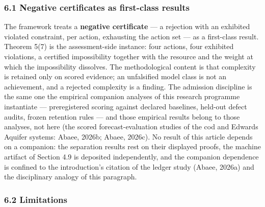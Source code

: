 \documentclass[11pt]{article}
\begin{document}
\subsubsection{6.1 Negative certificates as first-class
results}\label{negative-certificates-as-first-class-results}

The framework treats a \textbf{negative certificate} --- a rejection
with an exhibited violated constraint, per action, exhausting the action
set --- as a first-class result. Theorem 5(7) is the assessment-side
instance: four actions, four exhibited violations, a certified
impossibility together with the resource and the weight at which the
impossibility dissolves. The methodological content is that complexity
is retained only on scored evidence; an unfalsified model class is not
an achievement, and a rejected complexity is a finding. The admission
discipline is the same one the empirical companion analyses of this
research programme instantiate --- preregistered scoring against
declared baselines, held-out defect audits, frozen retention rules ---
and those empirical results belong to those analyses, not here (the
scored forecast-evaluation studies of the cod and Edwards Aquifer
systems: Abaee, 2026b; Abaee, 2026c). No result of this article depends
on a companion: the separation results rest on their displayed proofs,
the machine artifact of Section 4.9 is deposited independently, and the
companion dependence is confined to the introduction's citation of the
ledger study (Abaee, 2026a) and the disciplinary analogy of this
paragraph.

\subsubsection{6.2 Limitations}\label{limitations}
\end{document}
